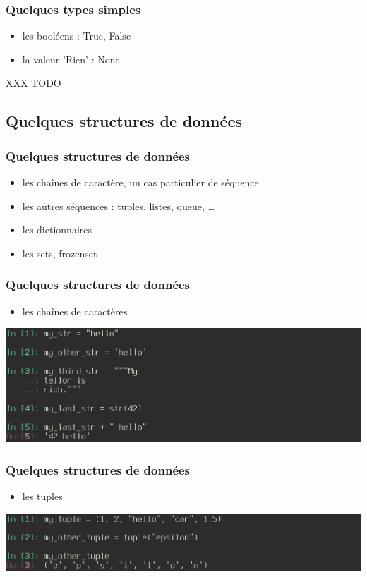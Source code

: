 \begin{frame}
  \frametitle{Quelques types simples}
    \begin{itemize}
      \item les booléens : \alert{True, False}
      \item la valeur 'Rien' : \alert{None}
    \end{itemize}
XXX TODO
\end{frame}


\subsection{Quelques structures de données}
\begin{frame}
  \frametitle{Quelques structures de données}
  \begin{itemize}
      \item<1-> les chaînes de caractère, un cas particulier de séquence
      \item<2-> les autres séquences : tuples, listes, queue, \ldots
      \item<3-> les dictionnaires
      \item<4-> les sets, frozenset
    \end{itemize}
\end{frame}

\begin{frame}
  \frametitle{Quelques structures de données}
    \begin{itemize}
      \item les chaînes de caractères
    \end{itemize}
    \includegraphics[scale=0.35]{type_str.png}
\end{frame}

\begin{frame}
  \frametitle{Quelques structures de données}
    \begin{itemize}
      \item les tuples
    \end{itemize}
    \includegraphics[scale=0.35]{type_tuple.png}
\end{frame}

